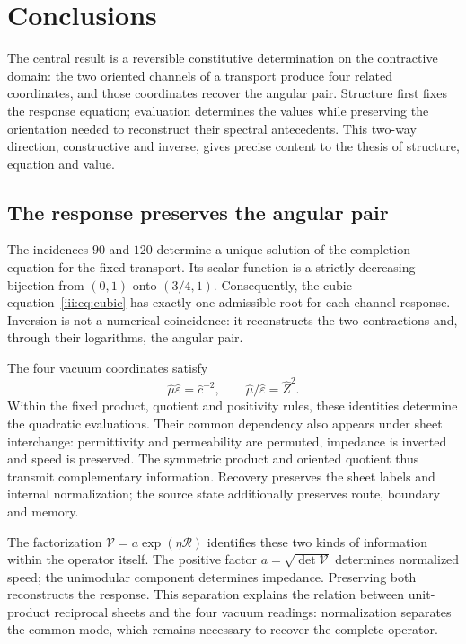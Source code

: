 \section{Conclusions}
\label{iii:sec:conclusiones}
\begingroup
\fontsize{10.5}{12.8}\selectfont
\setlength{\parskip}{2pt plus .5pt minus .5pt}

The central result is a reversible constitutive determination on
the contractive domain: the two oriented channels of a transport
produce four related coordinates, and those coordinates recover
the angular pair. Structure first fixes the response equation;
evaluation determines the values while preserving the orientation
needed to reconstruct their spectral antecedents. This two-way
direction, constructive and inverse, gives precise content to the
thesis of structure, equation and value.

\subsection*{The response preserves the angular pair}

The incidences $90$ and $120$ determine a unique solution of the
completion equation for the fixed transport. Its scalar function is
a strictly decreasing bijection from $(0,1)$ onto $(3/4,1)$.
Consequently, the cubic equation~\eqref{iii:eq:cubic} has exactly
one admissible root for each channel response. Inversion is not a
numerical coincidence: it reconstructs the two contractions and,
through their logarithms, the angular pair.

The four vacuum coordinates satisfy
\[
\widehat\mu\widehat\varepsilon=\widehat c^{-2},\qquad
\widehat\mu/\widehat\varepsilon=\widehat Z^2.
\]
Within the fixed product, quotient and positivity rules, these
identities determine the quadratic evaluations. Their common
dependency also appears under sheet interchange: permittivity and
permeability are permuted, impedance is inverted and speed is
preserved. The symmetric product and oriented quotient thus transmit
complementary information. Recovery preserves the sheet labels and
internal normalization; the source state additionally preserves
route, boundary and memory.

The factorization $\mathcal V=a\exp(\eta\mathcal R)$ identifies
these two kinds of information within the operator itself. The positive
factor $a=\sqrt{\det\mathcal V}$ determines normalized speed;
the unimodular component determines impedance. Preserving both
reconstructs the response. This separation explains the relation between
unit-product reciprocal sheets and the four vacuum readings:
normalization separates the common mode, which remains necessary
to recover the complete operator.

